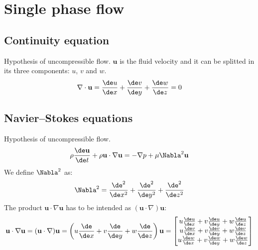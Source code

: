 \chapter{Single phase flow}

\section{Continuity equation}
Hypothesis of uncompressible flow. $\mathbf u$ is the fluid velocity and it can be splitted in its three components: $u$, $v$ and $w$.
\begin{equation}
\nabla \cdot\mathbf u=\frac{\de u}{\de x}+\frac{\de v}{\de y} +\frac{\de w}{\de z}=0
\end{equation}

\section{Navier--Stokes equations}
Hypothesis of uncompressible flow.
\begin{equation}
\rho \frac{\de \mathbf u}{\de t} +\rho \mathbf u \cdot \nabla \mathbf u =-\nabla p +\mu \Nabla^2 \mathbf u
\end{equation}
We define $\Nabla^2$ as:
\[
\Nabla^2=\frac{\de^2}{\de x^2}+\frac{\de^2}{\de y^2}+\frac{\de^2}{\de z^2}
\]
The product $\mathbf u \cdot \nabla \mathbf u$ has to be intended as $(\mathbf u\cdot\nabla)\mathbf u$:
\renewcommand\arraystretch{1.5}
\[
\mathbf u \cdot \nabla \mathbf u=(\mathbf u\cdot\nabla)\mathbf u=\left( u\frac{\de}{\de x} +v\frac{\de}{\de y}+w\frac{\de}{\de z}\right) \mathbf u =
\begin{bmatrix}
u\frac{\de u}{\de x} +v\frac{\de u}{\de y}+w\frac{\de u}{\de z}\\
u\frac{\de v}{\de x} +v\frac{\de v}{\de y}+w\frac{\de v}{\de z}\\
u\frac{\de w}{\de x} +v\frac{\de w}{\de y}+w\frac{\de w}{\de z}\\
\end{bmatrix}
\]
\renewcommand\arraystretch{1}

